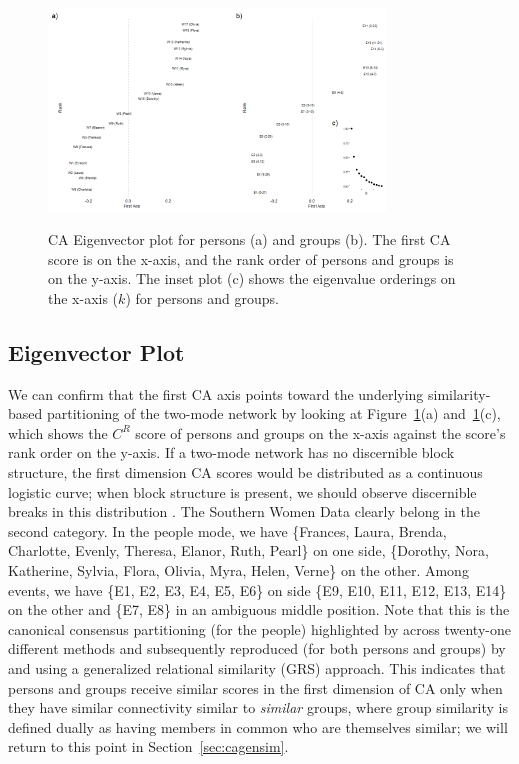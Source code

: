 \documentclass[a4paper,fleqn]{cas-sc}
\begin{document}
\begin{figure}[ht!]
    \centering
        \includegraphics[width=0.8\textwidth]{Plots/ca-eigvec.png}            
        \label{fig:eigvec}
    \caption{CA Eigenvector plot for persons (a) and groups (b). The first CA score is on the x-axis, and the rank order of persons and groups is on the y-axis. The inset plot (c) shows the eigenvalue orderings on the x-axis ($k$) for persons and groups.}
    \label{fig:ca-eigvec}
\end{figure}

\subsection{Eigenvector Plot} \label{subsec:eigplot}
We can confirm that the first CA axis points toward the underlying similarity-based partitioning of the two-mode network by looking at Figure~\ref{fig:ca-eigvec}(a) and~\ref{fig:ca-eigvec}(c), which shows the $C^R$ score of persons and groups on the x-axis against the score's rank order on the y-axis. If a two-mode network has no discernible block structure, the first dimension CA scores would be distributed as a continuous logistic curve; when block structure is present, we should observe discernible breaks in this distribution \citep{van2021correspondence}. The Southern Women Data clearly belong in the second category. In the people mode, we have \{Frances, Laura, Brenda, Charlotte, Evenly, Theresa, Elanor, Ruth, Pearl\} on one side, \{Dorothy, Nora, Katherine, Sylvia, Flora, Olivia, Myra, Helen, Verne\} on the other. Among events, we have \{E1, E2, E3, E4, E5, E6\} on side \{E9, E10, E11, E12, E13, E14\} on the other and \{E7, E8\} in an ambiguous middle position. Note that this is the canonical consensus partitioning (for the people) highlighted by \citet{freeman2003finding} across twenty-one different methods and subsequently reproduced (for both persons and groups) by \citet{kovacs2010generalized} and \citet{lizardo2024two} using a generalized relational similarity (GRS) approach. This indicates that persons and groups receive similar scores in the first dimension of CA only when they have similar connectivity similar to \textit{similar} groups, where group similarity is defined dually as having members in common who are themselves similar; we will return to this point in Section~\ref{sec:cagensim}. 
\end{document}
